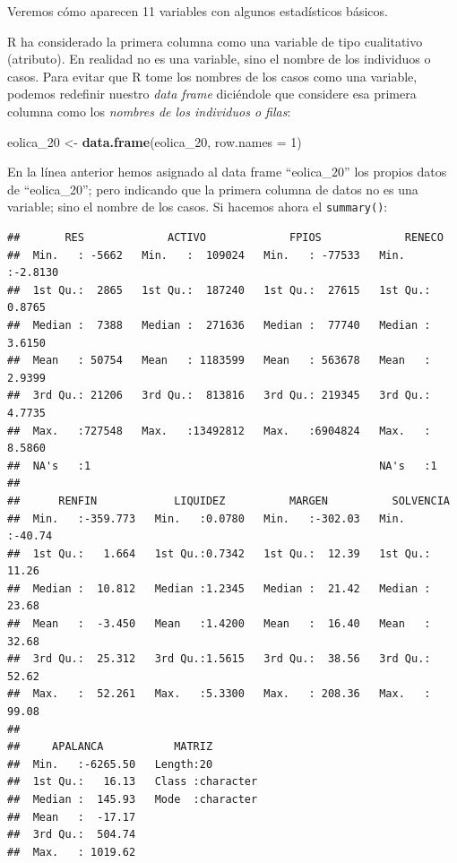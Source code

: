 \documentclass[
]{book}
\newenvironment{Shaded}{\begin{snugshade}}{\end{snugshade}}
\newcommand{\AttributeTok}[1]{\textcolor[rgb]{0.13,0.29,0.53}{#1}}
\newcommand{\DecValTok}[1]{\textcolor[rgb]{0.00,0.00,0.81}{#1}}
\newcommand{\FunctionTok}[1]{\textcolor[rgb]{0.13,0.29,0.53}{\textbf{#1}}}
\newcommand{\NormalTok}[1]{#1}
\newcommand{\OtherTok}[1]{\textcolor[rgb]{0.56,0.35,0.01}{#1}}
\begin{document}
Veremos cómo aparecen 11 variables con algunos estadísticos básicos.

R ha considerado la primera columna como una variable de tipo cualitativo (atributo). En realidad no es una variable, sino el nombre de los individuos o casos. Para evitar que R tome los nombres de los casos como una variable, podemos redefinir nuestro \emph{data frame} diciéndole que considere esa primera columna como los \emph{nombres de los individuos o filas}:

\begin{Shaded}
\begin{Highlighting}[]
\NormalTok{eolica\_20 }\OtherTok{\textless{}{-}} \FunctionTok{data.frame}\NormalTok{(eolica\_20, }\AttributeTok{row.names =} \DecValTok{1}\NormalTok{)}
\end{Highlighting}
\end{Shaded}

En la línea anterior hemos asignado al data frame ``eolica\_20'' los propios datos de ``eolica\_20''; pero indicando que la primera columna de datos no es una variable; sino el nombre de los casos. Si hacemos ahora el \texttt{summary()}:

\begin{verbatim}
##       RES             ACTIVO             FPIOS             RENECO       
##  Min.   : -5662   Min.   :  109024   Min.   : -77533   Min.   :-2.8130  
##  1st Qu.:  2865   1st Qu.:  187240   1st Qu.:  27615   1st Qu.: 0.8765  
##  Median :  7388   Median :  271636   Median :  77740   Median : 3.6150  
##  Mean   : 50754   Mean   : 1183599   Mean   : 563678   Mean   : 2.9399  
##  3rd Qu.: 21206   3rd Qu.:  813816   3rd Qu.: 219345   3rd Qu.: 4.7735  
##  Max.   :727548   Max.   :13492812   Max.   :6904824   Max.   : 8.5860  
##  NA's   :1                                             NA's   :1        
## 
##      RENFIN            LIQUIDEZ          MARGEN          SOLVENCIA     
##  Min.   :-359.773   Min.   :0.0780   Min.   :-302.03   Min.   :-40.74  
##  1st Qu.:   1.664   1st Qu.:0.7342   1st Qu.:  12.39   1st Qu.: 11.26  
##  Median :  10.812   Median :1.2345   Median :  21.42   Median : 23.68  
##  Mean   :  -3.450   Mean   :1.4200   Mean   :  16.40   Mean   : 32.68  
##  3rd Qu.:  25.312   3rd Qu.:1.5615   3rd Qu.:  38.56   3rd Qu.: 52.62  
##  Max.   :  52.261   Max.   :5.3300   Max.   : 208.36   Max.   : 99.08  
## 
##     APALANCA           MATRIZ         
##  Min.   :-6265.50   Length:20         
##  1st Qu.:   16.13   Class :character  
##  Median :  145.93   Mode  :character  
##  Mean   :  -17.17                     
##  3rd Qu.:  504.74                     
##  Max.   : 1019.62
\end{verbatim}
\end{document}
